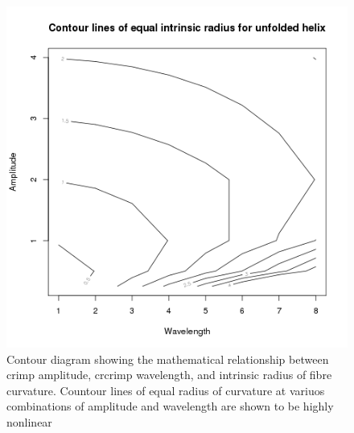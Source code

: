 %

\begin{figure}[!h]
  \centering
  \includegraphics[width=1.0\textwidth]{Rplot002.png}
  \caption{Contour diagram showing the mathematical relationship between crimp amplitude, crcrimp wavelength, and intrinsic radius of fibre curvature. Countour lines of equal radius of curvature at variuos combinations of amplitude and wavelength are shown to be highly nonlinear}
  \label{fig:nonlin}
\end{figure}

%

